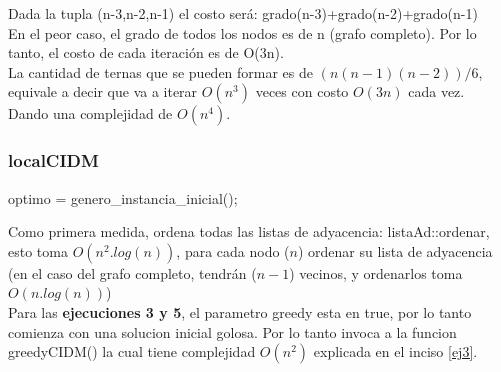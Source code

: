 Dada la tupla (n-3,n-2,n-1) el costo ser\'a: grado(n-3)+grado(n-2)+grado(n-1)\\

En el peor caso, el grado de todos los nodos es de n (grafo completo). Por lo tanto, el costo de cada iteraci\'on es de O(3n).\\

La cantidad de ternas que se pueden formar es de $(n(n-1)(n-2))/6$, equivale a decir que va a iterar $O(n^3)$ veces con costo $O(3n)$ cada vez.\\

Dando una complejidad de $O(n^4)$.

\newpage
\subsubsection{localCIDM}

\begin{algorithm}[h!]
optimo = genero_instancia_inicial();\\
\end{algorithm}

Como primera medida, ordena todas las listas de adyacencia: listaAd::ordenar, esto toma $O(n^2.log(n))$, para cada nodo ($n$) ordenar su lista de adyacencia (en el caso del grafo completo, tendr\'an ($n-1$) vecinos, y ordenarlos toma $O(n.log(n))$)\\

Para las \textbf{ejecuciones 3 y 5}, el parametro greedy esta en true, por lo tanto comienza con una solucion inicial golosa. Por lo tanto invoca a la funcion greedyCIDM() la cual tiene complejidad $O(n^2)$ explicada en el inciso \ref{ej3}.\\

